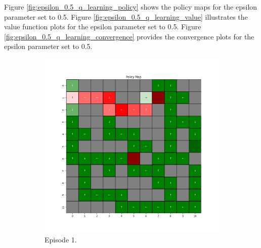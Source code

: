 \documentclass{assignment}
\begin{document}
Figure \ref{fig:epsilon_0.5_q_learning_policy} shows the policy maps for the epsilon parameter set to 0.5.     Figure \ref{fig:epsilon_0.5_q_learning_value} illustrates the value function plots for the epsilon parameter set to 0.5. Figure \ref{fig:epsilon_0.5_q_learning_convergence} provides the convergence plots for the epsilon parameter set to 0.5.

\begin{figure}[H]
    \begin{subfigure}{0.3\textwidth}
        \includegraphics[width=\textwidth]{figures/policy_q/epsilon_sweep/policy_alpha_0.1_gamma_0.95_epsilon_0.5_iteration_1.png}
    \caption{Episode 1.}
    \end{subfigure}\hfill
    \begin{subfigure}{0.3\textwidth}

\end{subfigure}
\end{figure}
\end{document}
